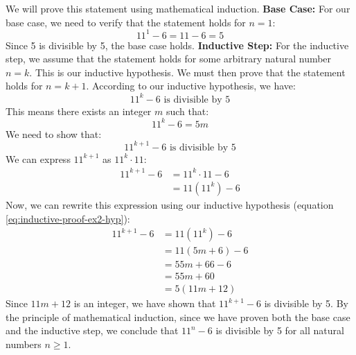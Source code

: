 \begin{answer}
    We will prove this statement using mathematical induction.
    \newline\newline
    \textbf{Base Case:} For our base case, we need to verify that the statement holds for $n=1$:
    \begin{equation*}
        11^1 - 6 = 11 - 6 = 5
    \end{equation*}
    Since 5 is divisible by 5, the base case holds.
    \newline\newline
    \textbf{Inductive Step:} For the inductive step, we assume that the statement holds for some arbitrary natural number $n=k$. 
    This is our inductive hypothesis. We must then prove that the statement holds for $n=k+1$. 
    According to our inductive hypothesis, we have:
    \begin{equation*}
        11^k - 6 \text{ is divisible by } 5
    \end{equation*}
    This means there exists an integer $m$ such that:
    \begin{equation}\label{eq:inductive-proof-ex2-hyp}
        11^k - 6 = 5m
    \end{equation}
    We need to show that:
    \begin{equation*}
        11^{k+1} - 6 \text{ is divisible by } 5
    \end{equation*}
    We can express $11^{k+1}$ as $11^k \cdot 11$:
    \begin{align*}
        11^{k+1} - 6 &= 11^k \cdot 11 - 6 \\
                     &= 11(11^k) - 6
    \end{align*}
    Now, we can rewrite this expression using our inductive hypothesis (equation \ref{eq:inductive-proof-ex2-hyp}):
    \begin{align*}
        11^{k+1} - 6 &= 11(11^k) - 6 \\
                     &= 11(5m + 6) - 6\\
                     &= 55m + 66 - 6 \\
                     &= 55m + 60 \\
                     &= 5(11m + 12)
    \end{align*}
    Since $11m + 12$ is an integer, we have shown that $11^{k+1} - 6$ is divisible by 5.
    \newline\newline
    By the principle of mathematical induction, since we have proven both the base case and the inductive step,
    we conclude that $11^n - 6$ is divisible by 5 for all natural numbers $n \geq 1$.
\end{answer}